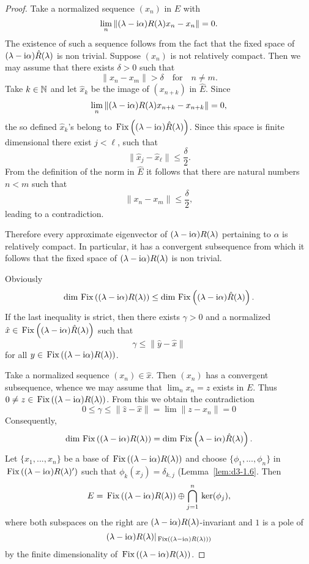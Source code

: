 \begin{proof}
Take a normalized sequence $(x_{n})$ in $E$ with
\[
\lim_{n}\|(\lambda - \mathrm{i}\alpha)R(\lambda)x_{n} - x_{n}\| = 0 .
\]
The existence of such a sequence follows from the fact that the fixed space of {$(\lambda-\mathrm{i}\alpha)\hat{R}(\lambda)$} is non trivial.
Suppose $(x_{n})$ is not relatively compact.
Then we may assume that there exists $\delta > 0$ such that
\[
	\|x_{n} - x_{m}\| > \delta \quad \text{for} \quad n \neq m .
\]
Take $k \in \mathbb{N} $ and let $\hat{x}_{k}$ be the image of $(x_{n+k})$ in $\hat{E}$.
Since
\[
	\lim_{n}\|(\lambda - \mathrm{i}\alpha)R(\lambda)x_{n+k} - x_{n+k}\| = 0 ,
\]
the so defined $\hat{x}_{k}$'s belong to $\mathop{}\mathrm{Fix}\left((\lambda - \mathrm{i}\alpha)\hat{R}(\lambda)\right)$.
Since this space is finite dimensional there exist $j < \ell$,  such that
\[
	\|\hat{x}_{j} - \hat{x}_{\ell}\| \leq \frac{\delta}{2} .
\]
From the definition of the norm in $\hat{E}$ it follows that there are natural numbers $n < m$ such that
\[
\|x_{n} - x_{m}\| \leq \frac{\delta}{2} ,
\]
leading to a contradiction.

Therefore every approximate eigenvector of $(\lambda - \mathrm{i}\alpha)R(\lambda)$ pertaining to $\alpha$ is relatively compact.
In particular, it has a convergent subsequence from which it follows that the fixed space of $(\lambda - \mathrm{i}\alpha)R(\lambda)$ is non trivial.

Obviously
\[
\dim \mathop{}\mathrm{Fix}\left((\lambda - \mathrm{i}\alpha)R(\lambda)\right) \leq \dim \mathop{}\mathrm{Fix}\left((\lambda - \mathrm{i}\alpha)\hat{R}(\lambda)\right) .
\]
If the last inequality is strict, then there exists $\gamma > 0$ and a normalized 
$\hat{x} \in \mathop{}\mathrm{Fix}\left((\lambda - \mathrm{i}\alpha)\hat{R}(\lambda)\right)$ such that
\[
\gamma \leq \|\hat{y} - \hat{x}\|
\]
for all $y \in \mathop{}\mathrm{Fix}\left((\lambda - \mathrm{i}\alpha)R(\lambda)\right)$.

Take a normalized sequence $(x_{n}) \in \hat{x}$.
Then $(x_{n})$ has a convergent subsequence, whence we may assume that $\lim_{n} x_{n} = z$ exists in $E$.
Thus $0 \neq z \in \mathop{}\mathrm{Fix}\left((\lambda - \mathrm{i}\alpha)R(\lambda)\right)$.
From this we obtain the contradiction
\[
 0 \leq \gamma \leq \|\hat{z} - \hat{x}\| = \lim \|z - x_{n}\| = 0
\]
Consequently,
\[
\dim \mathop{}\mathrm{Fix}\left((\lambda - \mathrm{i}\alpha)R(\lambda)\right) = \dim \mathop{}\mathrm{Fix}\left(\lambda - \mathrm{i}\alpha)\hat{R}(\lambda)\right).
\]
Let $\{x_{1},...,x_{n}\}$ be a base of 
$\mathop{}\mathrm{Fix}\left((\lambda - \mathrm{i}\alpha)R(\lambda)\right)$ and choose $\{\phi_{1},...,\phi_{n}\}$ in 
$\mathop{}\mathrm{Fix}\left((\lambda - \mathrm{i}\alpha)R(\lambda)'\right)$ such that $\phi_{k}(x_{j}) = \delta_{k,j}$ 
(Lemma~\ref{lem:d3-1.6}.
Then
\[
E = \mathop{}\mathrm{Fix}\left((\lambda - \mathrm{i}\alpha)R(\lambda)\right) \oplus \bigcap_{j=1}^{n} \mathop{}\mathrm{ker}(\phi_{j}),
\]
where both subspaces on the right are 
$(\lambda - \mathrm{i}\alpha)R(\lambda)$-invariant and $1$ is a pole of 
\[
(\lambda-\mathrm{i}\alpha)R(\lambda)|_{\mathop{}\mathrm{Fix}\left((\lambda-\mathrm{i}\alpha)R(\lambda))\right)}
\]
by the finite dimensionality of $\mathop{}\mathrm{Fix}\left((\lambda - \mathrm{i}\alpha)R(\lambda)\right)$.


\end{proof}
